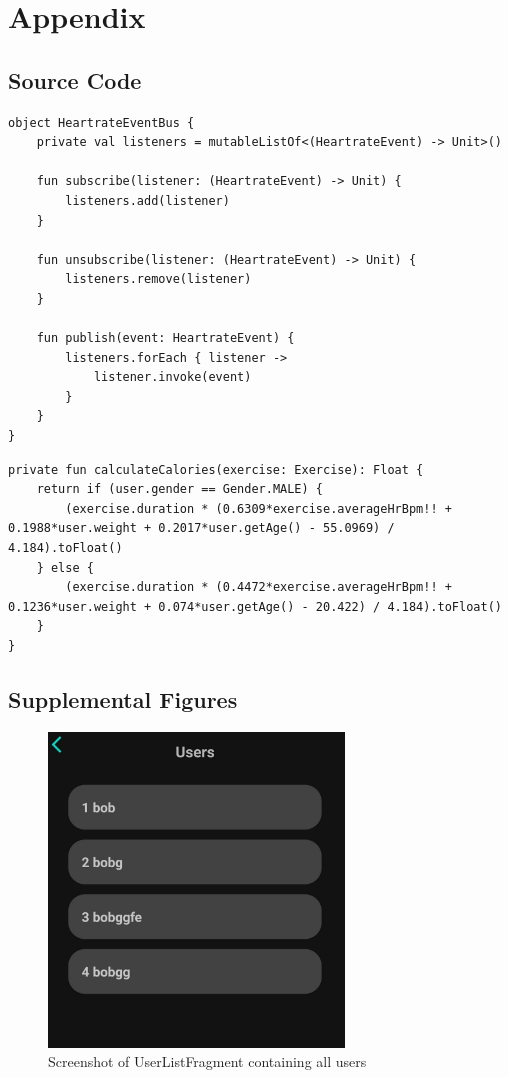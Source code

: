 \appendix


\chapter{Appendix}


\section{Source Code}
\begin{lstlisting}[caption={Implementation of EventBus (Kotlin - HeartrateEventBus)}]
object HeartrateEventBus {
    private val listeners = mutableListOf<(HeartrateEvent) -> Unit>()

    fun subscribe(listener: (HeartrateEvent) -> Unit) {
        listeners.add(listener)
    }

    fun unsubscribe(listener: (HeartrateEvent) -> Unit) {
        listeners.remove(listener)
    }

    fun publish(event: HeartrateEvent) {
        listeners.forEach { listener ->
            listener.invoke(event)
        }
    }
}
\end{lstlisting}

\begin{lstlisting}[caption={Implementation of calorie calculation (Kotlin - ExerciseService)}]
private fun calculateCalories(exercise: Exercise): Float {
    return if (user.gender == Gender.MALE) {
        (exercise.duration * (0.6309*exercise.averageHrBpm!! + 0.1988*user.weight + 0.2017*user.getAge() - 55.0969) / 4.184).toFloat()
    } else {
        (exercise.duration * (0.4472*exercise.averageHrBpm!! + 0.1236*user.weight + 0.074*user.getAge() - 20.422) / 4.184).toFloat()
    }
}
\end{lstlisting}

\section{Supplemental Figures}
\begin{figure}[H]
    \centering
    \includegraphics[width=0.7\textwidth]{images/userlistfragment-screenshot.jpeg}
    \caption{Screenshot of UserListFragment containing all users}
    \label{fig:userlistfragment}
\end{figure}